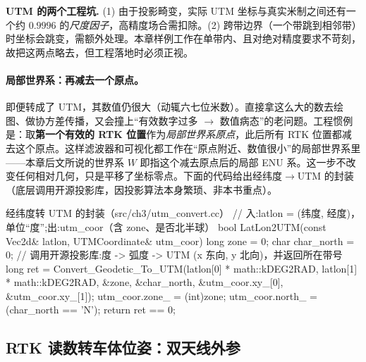 \begin{note}
\textbf{UTM 的两个工程坑.}\;
(1) 由于投影畸变，实际 UTM 坐标与真实米制之间还有一个约 $0.9996$ 的\emph{尺度因子}，高精度场合需扣除\cite{gao2023slamad}。(2) 跨带边界（一个带跳到相邻带）时坐标会跳变，需额外处理。本章样例工作在单带内、且对绝对精度要求不苛刻，故把这两点略去，但工程落地时必须正视。
\end{note}

\paragraph{局部世界系：再减去一个原点。}
即便转成了 UTM，其数值仍很大（动辄六七位米数）。直接拿这么大的数去绘图、做协方差传播，又会撞上“有效数字过多 $\to$ 数值病态”的老问题\cite{gao2023slamad}。工程惯例是：取\textbf{第一个有效的 RTK 位置}作为\emph{局部世界系原点}，此后所有 RTK 位置都减去这个原点。这样滤波器和可视化都工作在“原点附近、数值很小”的局部世界系里——本章后文所说的世界系 $W$ 即指这个减去原点后的局部 ENU 系。这一步不改变任何相对几何，只是平移了坐标零点。下面的代码给出经纬度$\to$UTM 的封装（底层调用开源投影库，因投影算法本身繁琐、非本书重点）。

\begin{codebox}[C++]{经纬度转 UTM 的封装（src/ch3/utm\_convert.cc）}
// 入:latlon = (纬度, 经度)，单位“度”;出:utm_coor（含 zone、是否北半球）
bool LatLon2UTM(const Vec2d& latlon, UTMCoordinate& utm_coor) {
  long zone = 0; char char_north = 0;
  // 调用开源投影库:度 -> 弧度 -> UTM (x 东向, y 北向)，并返回所在带号
  long ret = Convert_Geodetic_To_UTM(latlon[0] * math::kDEG2RAD,
                                     latlon[1] * math::kDEG2RAD, &zone, &char_north,
                                     &utm_coor.xy_[0], &utm_coor.xy_[1]);
  utm_coor.zone_  = (int)zone;
  utm_coor.north_ = (char_north == 'N');
  return ret == 0;
}
\end{codebox}

\subsection{RTK 读数转车体位姿：双天线外参}
\label{sec:gins-extrinsic}

